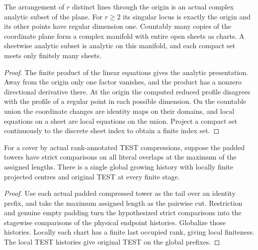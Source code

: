 \begin{theorem}
\label{hir:g8-disjoint-plane-arrangements}
\leanok
The arrangement of $r$ distinct lines through the origin is an
actual complex analytic subset of the plane. For $r\ge 2$ its
singular locus is exactly the origin and its other points have
regular dimension one. Countably many copies of the coordinate
plane form a complex manifold with entire open sheets as charts.
A sheetwise analytic subset is analytic on this manifold,
and each compact set meets only finitely many sheets.
\end{theorem}
\begin{proof}
The finite product of the linear equations gives the analytic
presentation. Away from the origin only one factor vanishes,
and the product has a nonzero directional derivative there.
At the origin the computed reduced profile disagrees with the
profile of a regular point in each possible dimension. On the
countable union the coordinate changes are identity maps on
their domains, and local equations on a sheet are local equations
on the union. Project a compact set continuously to the discrete
sheet index to obtain a finite index set.
\end{proof}

\begin{theorem}
\label{hir:g8-ranked-global-test-gluing}
\leanok
For a cover by actual rank-annotated TEST compressions, suppose the
padded towers have strict comparisons on all literal overlaps at the
maximum of the assigned lengths. There is a single global growing
history with locally finite projected centres and original TEST at
every finite stage.
\end{theorem}
\begin{proof}
Use each actual padded compressed tower as the tail over an identity
prefix, and take the maximum assigned length as the pairwise cut.
Restriction and genuine empty padding turn the hypothesized strict
comparisons into the stagewise comparisons of the physical endpoint
histories. Globalize those histories. Locally each chart has a finite
last occupied rank, giving local finiteness. The local TEST histories
give original TEST on the global prefixes.
\end{proof}

